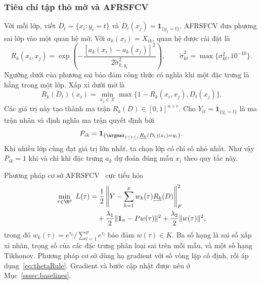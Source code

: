\subsubsection{Tiêu chí tập thô mờ và AFRSFCV}\label{ssec:afrsfcv}\label{sssec:afrsfcv-inputs}\label{sssec:afrsfcv-model}
Với mỗi lớp, viết $D_t=\{x_i:y_i=t\}$ và $D_t(x_j)=\mathbf1_{\{y_j=t\}}$. AFRSFCV đưa phương sai lớp vào một quan hệ mờ. Với $a_k(x_i)=X_{ik}$, quan hệ được cài đặt là
\begin{equation}\label{eq:simRel}
R_k(x_i,x_j)=\exp\!\left(-\frac{[a_k(x_i)-a_k(x_j)]^2}{2\widetilde\sigma_{k,y_i}^2}\right),
\qquad \widetilde\sigma_{kt}^2=\max\{\sigma_{kt}^2,10^{-10}\}.
\end{equation}
Ngưỡng dưới của phương sai bảo đảm công thức có nghĩa khi một đặc trưng là hằng trong một lớp. Xấp xỉ dưới mờ là
\begin{equation}\label{eq:lower}
\underline{R_k}(D_t)(x_i)=\min_{x_j\in\mathcal{X}}\max\{1-R_k(x_i,x_j),D_t(x_j)\}.
\end{equation}
Các giá trị này tạo thành ma trận $\underline{R_k}(D)\in[0,1]^{n\times r}$. Cho $Y_{it}=\mathbf1_{\{y_i=t\}}$ là ma trận nhãn và định nghĩa ma trận quyết định bởi
\begin{equation}\label{eq:Pmat}
P_{ik}=\mathbf1_{\{\argmax_{1\le t\le r}\underline{R_k}(D_t)(x_i)=y_i\}}.
\end{equation}
Khi nhiều lớp cùng đạt giá trị lớn nhất, ta chọn lớp có chỉ số nhỏ nhất. Như vậy $P_{ik}=1$ khi và chỉ khi đặc trưng $a_k$ dự đoán đúng mẫu $x_i$ theo quy tắc này.

Phương pháp cơ sở AFRSFCV~\citep{wang2026afrsfcv} cực tiểu hóa
\begin{equation}\label{eq:afrsfcvLoss}
\begin{split}
\min_{\tau\in\R^p}\ L(\tau)
&=\frac12\left\|Y-\sum_{k=1}^{p}w_k(\tau)\underline{R_k}(D)\right\|_F^2\\
&\quad+\frac{\lambda_1}{2}\|\mathbf1_n-Pw(\tau)\|^2+\frac{\lambda_2}{2}\|w(\tau)\|^2,
\end{split}
\end{equation}
trong đó $w_k(\tau)=e^{\tau_k}/\sum_{l=1}^{p}e^{\tau_l}$ bảo đảm $w(\tau)\in K$. Ba số hạng là sai số xấp xỉ nhãn, trọng số của các đặc trưng phân loại sai trên mỗi mẫu, và một số hạng Tikhonov. Phương pháp cơ sở dùng hạ gradient với số vòng lặp cố định, rồi áp dụng~\eqref{eq:thetaRule}. Gradient và bước cập nhật được nêu ở Mục~\ref{sssec:baselines}.

